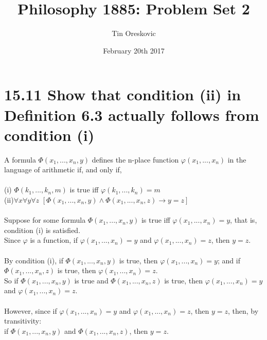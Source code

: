 \documentclass{article}
\title{Philosophy 1885: Problem Set 2}
\author{Tin Oreskovic}
\date{February 20th 2017}
\begin{document}
\maketitle
\section*{15.11 Show that condition (ii) in Definition 6.3 actually follows from condition (i)}
A formula  $\Phi(x_1, . . . , x_n, y)$ defines the n-place function
$\varphi(x_1, . . . , x_n)$ in the language of arithmetic if, and only if,\\
\\(i)  $\Phi(k_1,...,k_n,m)$ is true iff $\varphi(k_1,...,k_n) = m$\\
(ii)$\forall$$x$$\forall$$y$$\forall$$z$ $[\Phi(x_1,...,x_n,y) \wedge \Phi(x_1,...,x_n, z) \rightarrow y = z]$\\\\
Suppose for some formula $\Phi(x_1,...,x_n,y)$ is true iff $\varphi(x_1,...,x_n) = y$, that is, condition (i) is satisfied.\\
Since $\varphi$ is a function, if $\varphi(x_1,...,x_n) = y$ and $\varphi(x_1,...,x_n) = z$, then $y = z$.\\\\
By condition (i), if $\Phi(x_1,...,x_n,y)$ is true, then $\varphi(x_1,...,x_n) = y$; and if $\Phi(x_1,...,x_n,z)$ is true, then $\varphi(x_1,...,x_n) = z$.\\
So if $\Phi(x_1,...,x_n,y)$ is true and $\Phi(x_1,...,x_n,z)$ is true, then $\varphi(x_1,...,x_n) = y$ and $\varphi(x_1,...,x_n) = z$.\\\\
However, since if $\varphi(x_1,...,x_n) = y$ and $\varphi(x_1,...,x_n) = z$, then $y = z$, then, by transitivity:\\
if $\Phi(x_1,...,x_n,y)$ and $\Phi(x_1,...,x_n, z)$, then $y = z$.
\end{document}

